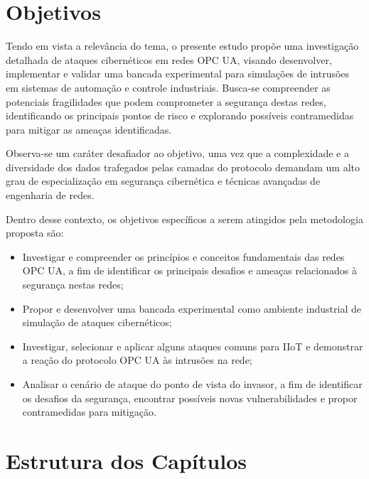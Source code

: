     \section{Objetivos} \label{sec:objetivos}

    Tendo em vista a relevância do tema, o presente estudo propõe uma investigação detalhada de ataques cibernéticos em redes OPC UA, visando desenvolver, implementar e validar uma bancada experimental para simulações de intrusões em sistemas de automação e controle industriais. Busca-se compreender as potenciais fragilidades que podem comprometer a segurança destas redes, identificando os principais pontos de risco e explorando possíveis contramedidas para mitigar as ameaças identificadas.

    Observa-se um caráter desafiador ao objetivo, uma vez que a complexidade e a diversidade dos dados trafegados pelas camadas do protocolo demandam um alto grau de especialização em segurança cibernética e técnicas avançadas de engenharia de redes.

    Dentro desse contexto, os objetivos específicos a serem atingidos pela metodologia proposta são:
    
    \begin{itemize}
        \item Investigar e compreender os princípios e conceitos fundamentais das redes OPC UA, a fim de identificar os principais desafios e ameaças relacionados à segurança nestas redes;
        \item Propor e desenvolver uma bancada experimental como ambiente industrial de simulação de ataques cibernéticos;
        \item Investigar, selecionar e aplicar alguns ataques comuns para IIoT e demonstrar a reação do protocolo OPC UA às intrusões na rede;
        \item Analisar o cenário de ataque do ponto de vista do invasor, a fim de identificar os desafios da segurança, encontrar possíveis novas vulnerabilidades e propor contramedidas para mitigação.
    \end{itemize}
    
    \section{Estrutura dos Capítulos} \label{sec:estCapitulos}

